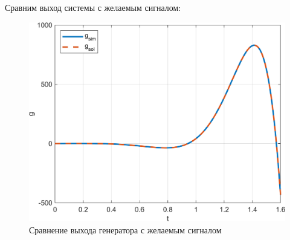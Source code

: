 Сравним выход системы с желаемым сигналом:
\begin{figure}[H]
    \centering
    \includegraphics[width=1\textwidth]{../images/3_1.png}
    \caption{Сравнение выхода генератора с желаемым сигналом}
\end{figure}
\endinput